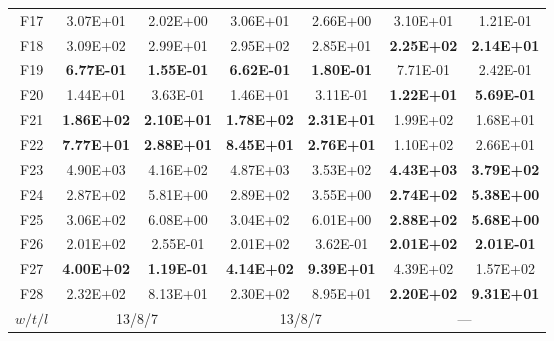 \begin{table*}[!ht]
\begin{tabular}{|c|cc|cc|cc|}
    F17   & 3.07E+01 & 2.02E+00 & 3.06E+01 & 2.66E+00 & 3.10E+01 & 1.21E-01 \\
    F18   & 3.09E+02 & 2.99E+01 & 2.95E+02 & 2.85E+01 & \textbf{2.25E+02} & \textbf{2.14E+01} \\
    F19   & \textbf{6.77E-01} & \textbf{1.55E-01} & \textbf{6.62E-01} & \textbf{1.80E-01} & 7.71E-01 & 2.42E-01 \\
    F20   & 1.44E+01 & 3.63E-01 & 1.46E+01 & 3.11E-01 & \textbf{1.22E+01} & \textbf{5.69E-01} \\
    \hline
    F21   & \textbf{1.86E+02} & \textbf{2.10E+01} & \textbf{1.78E+02} & \textbf{2.31E+01} & 1.99E+02 & 1.68E+01 \\
    F22   & \textbf{7.77E+01} & \textbf{2.88E+01} & \textbf{8.45E+01} & \textbf{2.76E+01} & 1.10E+02 & 2.66E+01 \\
    F23   & 4.90E+03 & 4.16E+02 & 4.87E+03 & 3.53E+02 & \textbf{4.43E+03} & \textbf{3.79E+02} \\
    F24   & 2.87E+02 & 5.81E+00 & 2.89E+02 & 3.55E+00 & \textbf{2.74E+02} & \textbf{5.38E+00} \\
    F25   & 3.06E+02 & 6.08E+00 & 3.04E+02 & 6.01E+00 & \textbf{2.88E+02} & \textbf{5.68E+00} \\
    F26   & 2.01E+02 & 2.55E-01 & 2.01E+02 & 3.62E-01 & \textbf{2.01E+02} & \textbf{2.01E-01} \\
    F27   & \textbf{4.00E+02} & \textbf{1.19E-01} & \textbf{4.14E+02} & \textbf{9.39E+01} & 4.39E+02 & 1.57E+02 \\
    F28   & 2.32E+02 & 8.13E+01 & 2.30E+02 & 8.95E+01 & \textbf{2.20E+02} & \textbf{9.31E+01} \\
    \hline
    $w/t/l$ & \multicolumn{2}{c|}{13/8/7} & \multicolumn{2}{c|}{13/8/7} & \multicolumn{2}{c|}{---} \\
    \hline
    \end{tabular}%
  \label{tab:AG_CEC13_origin30D}%
\end{table*}%

